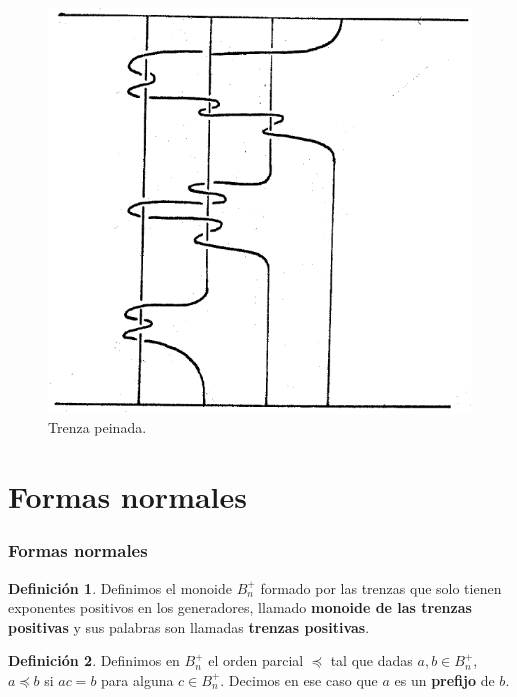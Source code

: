 \documentclass{beamer}
\theoremstyle{definition}
\newtheorem{defi}{Definición}
\begin{document}
\begin{frame}


\begin{figure}
\begin{turn}{1.5}
\includegraphics[scale=0.4]{Imagenes/peinado}
\end{turn}
\caption{Trenza peinada.}
\end{figure}

\end{frame}



\section{Formas normales}
\begin{frame}
\frametitle{Formas normales}
\begin{defi}
Definimos el monoide $B_n^+$ formado por las trenzas que solo tienen exponentes positivos en los generadores, llamado \textbf{monoide de las trenzas positivas} y sus palabras son llamadas \textbf{trenzas positivas}.
\end{defi}
\begin{defi}
Definimos en $B_n^+$ el orden parcial $\preccurlyeq$ tal que dadas $a,b\in B_n^+$, $a\preccurlyeq b$ si $ac=b$ para alguna $c\in B_n^+$. Decimos en ese caso que $a$ es un \textbf{prefijo} de $b$. %
\end{defi}
\end{frame}
\end{document}
